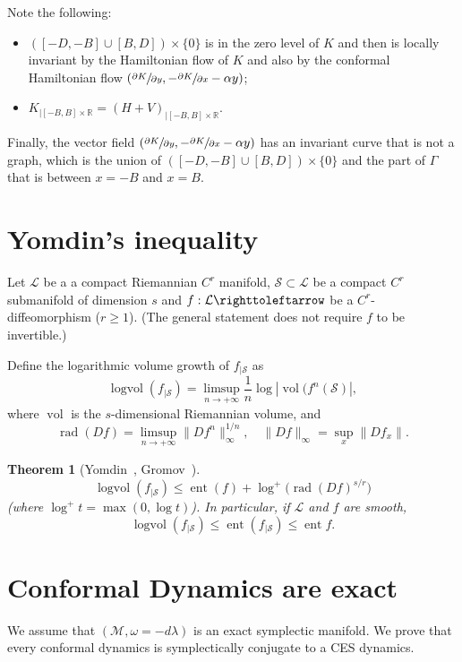 \documentclass[JEP,XML,SOM,Unicode,published]{cedram}
\newtheorem{theorem}{Theorem}
\theoremstyle{definition}
\def\R{\mathbb{R}}
\def\cL{{\mathcal L}}
\def\cM{{\mathcal M}}
\def\cS{{\mathcal S}}
\DeclareMathOperator{\ent}{ent}
\DeclareMathOperator\logvol{logvol}
\DeclareMathOperator\rad{rad}
\DeclareMathOperator\vol{vol}
\begin{document}
Note the following:
\begin{itemize}
\item $([-D, -B]\cup[B, D])\times\{ 0\}$ is in the zero level of $K$ and then is locally inva\-riant by the Hamiltonian flow of $K$ and also by the conformal Hamiltonian flow \hbox{$(\sfrac{\partial K}{\partial y}, -\sfrac{\partial K}{\partial x}-\alpha y)$};
\item $K_{|[-B, B]\times \R}=(H+V)_{|[-B, B]\times \R}$.
\end{itemize}
Finally, the vector field $(\sfrac{\partial K}{\partial y}, -\sfrac{\partial K}{\partial x}-\alpha y)$ has an invariant curve that is not a graph, which is the union of $([-D, -B]\cup[B, D])\times\{ 0\}$ and the part of $\Gamma$ that is between $x=-B$ and $x=B$.

\appendix

\section{Yomdin's inequality}
\label{AYomdin}

Let $\cL$ be a a compact Riemannian $C^r$ manifold, $\cS \subset \cL$ be a compact $C^r$ submanifold of dimension $s$ and $f : \cL \righttoleftarrow$ be a { $C^r$-diffeomorphism} ($r \geq 1$). (The general statement does not require $f$ to be invertible.)

Define the logarithmic volume growth of $f_{|\cS}$ as
\[
\logvol(f_{|\cS}) = \limsup_{n \to +\infty} \frac{1}{n} \log | \vol(f^{n}(\cS)|,
\]
where $\vol$ is the $s$-dimensional Riemannian volume, and
\[
\rad (Df) = \limsup_{n \to +\infty} \|Df^n\|_\infty^{1/n}, \quad \|Df\|_\infty = \sup_x \|Df_x\|.
\]

\skpt\begin{theorem}[Yomdin~\cite{Yom1987}, Gromov~\cite{Gromov1987}]\mbox{}\vspace*{-\baselineskip}
\[
\logvol (f_{|\cS}) \leq \ent (f) + \log^+\bigl(\rad(Df)^{s/r}\bigr)
\]
(where $\log^+ t = \max (0, \log t)$). In particular, if $\cL$ and $f$ are smooth,
\[
\logvol (f_{|\cS}) \leq \ent (f_{|\cS}) \leq \ent f.
\]
\end{theorem}

\section{Conformal Dynamics are exact} \label{Aconfexact}

We assume that $(\cM, \omega=-d\lambda)$ is an exact symplectic manifold. We prove that every conformal dynamics is symplectically conjugate to a CES dynamics.
\end{document}
